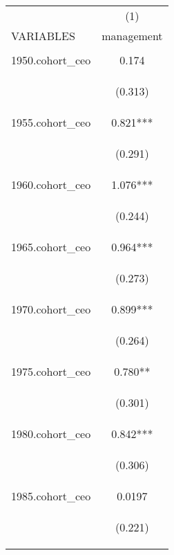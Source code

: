 \begin{center}
\begin{tabular}{lc} \hline
 & (1) \\
VARIABLES & management \\ \hline
\vspace{4pt} & \begin{footnotesize}\end{footnotesize} \\
1950.cohort\_ceo & 0.174 \\
\vspace{4pt} & \begin{footnotesize}(0.313)\end{footnotesize} \\
1955.cohort\_ceo & 0.821*** \\
\vspace{4pt} & \begin{footnotesize}(0.291)\end{footnotesize} \\
1960.cohort\_ceo & 1.076*** \\
\vspace{4pt} & \begin{footnotesize}(0.244)\end{footnotesize} \\
1965.cohort\_ceo & 0.964*** \\
\vspace{4pt} & \begin{footnotesize}(0.273)\end{footnotesize} \\
1970.cohort\_ceo & 0.899*** \\
\vspace{4pt} & \begin{footnotesize}(0.264)\end{footnotesize} \\
1975.cohort\_ceo & 0.780** \\
\vspace{4pt} & \begin{footnotesize}(0.301)\end{footnotesize} \\
1980.cohort\_ceo & 0.842*** \\
\vspace{4pt} & \begin{footnotesize}(0.306)\end{footnotesize} \\
1985.cohort\_ceo & 0.0197 \\
\vspace{4pt} & \begin{footnotesize}(0.221)\end{footnotesize} \\

\end{tabular}
\end{center}
